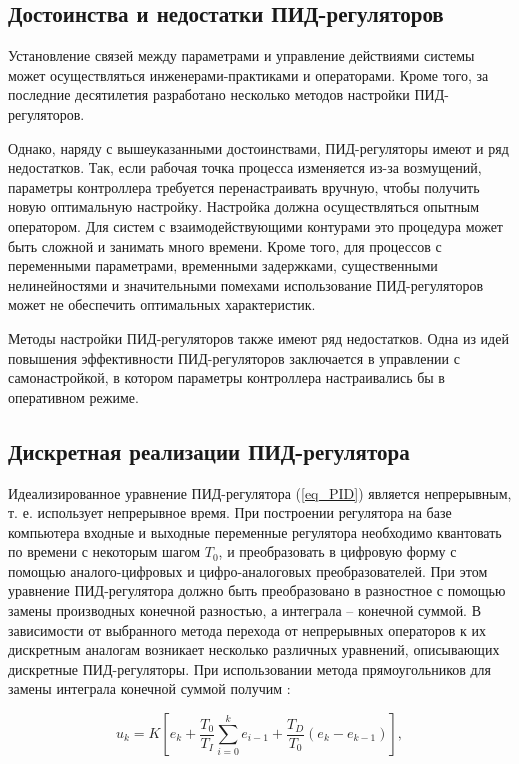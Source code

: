 \subsection{Достоинства и недостатки ПИД-регуляторов}

Установление связей между параметрами и управление действиями системы может осуществляться инженерами-практиками и операторами.
Кроме того, за последние десятилетия разработано несколько методов настройки ПИД-регуляторов.

Однако, наряду с вышеуказанными достоинствами, ПИД-регуляторы имеют и ряд недостатков. Так, если рабочая точка процесса изменяется из-за возмущений, параметры контроллера требуется перенастраивать вручную, чтобы получить новую оптимальную настройку. Настройка должна осуществляться опытным оператором. Для систем с взаимодействующими контурами это процедура может быть сложной и занимать много времени. Кроме того, для процессов с переменными параметрами, временными задержками, существенными нелинейностями и значительными помехами использование ПИД-регуляторов может не обеспечить оптимальных характеристик.

Методы настройки ПИД-регуляторов также имеют ряд недостатков.
Одна из идей повышения эффективности ПИД-регуляторов заключается в управлении с самонастройкой, в котором параметры контроллера настраивались бы в оперативном режиме.

\subsection{Дискретная реализации ПИД-регулятора}

Идеализированное уравнение ПИД-регулятора (\ref{eq_PID}) является непрерывным, т. е. использует непрерывное время. При построении регулятора на базе компьютера входные и выходные переменные регулятора необходимо квантовать по времени с некоторым шагом $T_0$, и преобразовать в цифровую форму с помощью аналого-цифровых и цифро-аналоговых преобразователей. При этом уравнение ПИД-регулятора должно быть преобразовано в разностное с помощью замены производных конечной разностью, а интеграла – конечной суммой. В зависимости от выбранного метода перехода от непрерывных операторов к их дискретным аналогам возникает несколько различных уравнений, описывающих дискретные ПИД-регуляторы. При использовании метода прямоугольников для замены интеграла конечной суммой получим \cite{PID_NIL_AP}:


\begin{equation}\label{eq_discrete_PID}
    u_k = K\left[ e_k + \frac{T_0}{T_I} \sum_{i = 0}^{k} {e_{i - 1}} + \frac{T_D}{T_0} (e_k - e_{k - 1})\right],
\end{equation}

